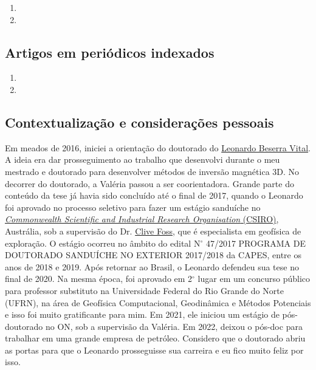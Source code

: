 \begin{enumerate}
	\item {}
	\item {}
\end{enumerate}


\subsection*{Artigos em periódicos indexados}

\begin{enumerate}
	\item {}
	\item {}
\end{enumerate}

\clearpage

\subsection*{Contextualização e considerações pessoais}

Em meados de 2016, iniciei a orientação do doutorado do 
\href{https://lattes.cnpq.br/3155435296388448}{Leonardo Beserra Vital}.
A ideia era dar prosseguimento ao trabalho que desenvolvi durante o meu mestrado e 
doutorado para desenvolver métodos de inversão magnética 3D.
No decorrer do doutorado, a Valéria passou a ser coorientadora.
Grande parte do conteúdo da tese já havia sido concluído até o final de 2017, quando
o Leonardo foi aprovado no processo seletivo para fazer um estágio sanduíche no 
\href{https://www.csiro.au/}{\textit{Commonwealth Scientific and Industrial Research Organisation} (CSIRO)}, Austrália, sob a supervisão do Dr.
\href{https://confluence.csiro.au/display/cmfr/CSIRO+Remanent+Magnetists}{Clive Foss}, 
que é especialista em geofísica de exploração. O estágio ocorreu no âmbito do edital
N$^{\circ}$ 47/2017 PROGRAMA DE DOUTORADO SANDUÍCHE NO EXTERIOR 2017/2018 da CAPES, 
entre os anos de 2018 e 2019. Após retornar ao Brasil, o Leonardo defendeu sua tese
no final de 2020. Na mesma época, foi aprovado em 2$^{\circ}$ lugar em um concurso 
público para
professor substituto na Universidade Federal do Rio Grande do Norte (UFRN), na área de
Geofísica Computacional, Geodinâmica e Métodos Potenciais e isso foi muito gratificante
para mim. Em 2021, ele iniciou um estágio de pós-doutorado no ON, sob a supervisão da
Valéria. Em 2022, deixou o pós-doc para trabalhar em uma grande empresa de petróleo.
Considero que o doutorado abriu as portas para que o Leonardo prosseguisse sua 
carreira e eu fico muito feliz por isso.

